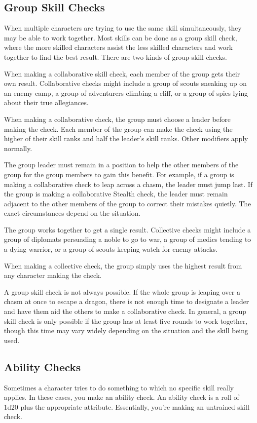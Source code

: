 \subsection{Group Skill Checks}
When multiple characters are trying to use the same skill simultaneously, they may be able to work together. Most skills can be done as a group skill check, where the more skilled characters assist the less skilled characters and work together to find the best result. There are two kinds of group skill checks.

 When making a collaborative skill check, each member of the group gets their own result. Collaborative checks might include a group of scouts sneaking up on an enemy camp, a group of adventurers climbing a cliff, or a group of spies lying about their true allegiances.

When making a collaborative check, the group must choose a leader before making the check. Each member of the group can make the check using the higher of their skill ranks and half the leader's skill ranks. Other modifiers apply normally.

The group leader must remain in a position to help the other members of the group for the group members to gain this benefit. For example, if a group is making a collaborative check to leap across a chasm, the leader must jump last. If the group is making a collaborative Stealth check, the leader must remain adjacent to the other members of the group to correct their mistakes quietly. The exact circumstances depend on the situation. 

 The group works together to get a single result. Collective checks might include a group of diplomats persuading a noble to go to war, a group of medics tending to a dying warrior, or a group of scouts keeping watch for enemy attacks.

When making a collective check, the group simply uses the highest result from any character making the check.

 A group skill check is not always possible. If the whole group is leaping over a chasm at once to escape a dragon, there is not enough time to designate a leader and have them aid the others to make a collaborative check. In general, a group skill check is only possible if the group has at least five rounds to work together, though this time may vary widely depending on the situation and the skill being used. 

\subsection{Ability Checks}
Sometimes a character tries to do something to which no specific skill really applies. In these cases, you make an ability check. An ability check is a roll of 1d20 plus the appropriate attribute. Essentially, you're making an untrained skill check.

